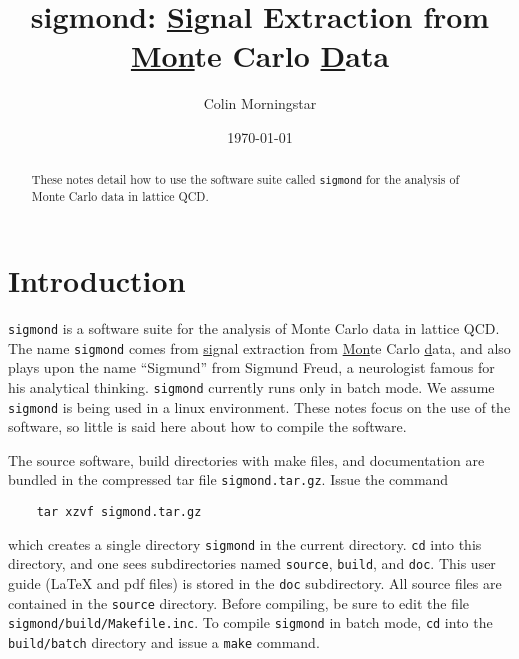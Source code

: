 \documentclass[12pt]{article}
\newcommand{\sigmond}{\texttt{sigmond} }
\newcommand{\vb}{\texttt}
\begin{document}
\title{\bf sigmond: \underline{Sig}nal Extraction from\\ 
\underline{Mon}te Carlo 
\underline{D}ata}
\author{Colin Morningstar}
\date{\today}
\maketitle
\begin{abstract}
These notes detail how to use the software suite called \sigmond for
the analysis of Monte Carlo data in lattice QCD.
\end{abstract}

\section{Introduction}

\sigmond is a software suite for the analysis of Monte Carlo data in 
lattice QCD.  The name \texttt{sigmond} comes from \underline{sig}nal 
extraction from \underline{Mon}te Carlo \underline{d}ata, and also plays 
upon the name ``Sigmund'' from Sigmund Freud, a neurologist famous for 
his analytical thinking.  
\sigmond currently runs only in batch mode.
We assume \sigmond is being used
in a linux environment.  These notes focus on the use of the software,
so little is said here about how to compile the software.

The source software, build directories with make files, and documentation
are bundled in the compressed tar file \vb{sigmond.tar.gz}.  Issue the
command
\begin{verbatim}
    tar xzvf sigmond.tar.gz
\end{verbatim}
which creates a single directory \vb{sigmond} in the current directory.
\vb{cd} into this directory, and one sees subdirectories named \vb{source}, 
\vb{build}, and \vb{doc}.  This user guide (LaTeX and pdf files)
is stored in the \vb{doc} subdirectory.  All source files are contained in 
the \vb{source} directory.   Before compiling, be sure to edit the file 
\vb{sigmond/build/Makefile.inc}.  To compile \vb{sigmond} in batch mode, 
\vb{cd} into the \vb{build/batch} directory and 
issue a \vb{make} command.  
\end{document}
